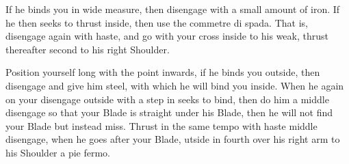 \newpage


\newpage


\exercise{}

If he binds you in wide measure, then disengage with a small amount of iron. If he then seeks to thrust inside, then use the commetre di spada. That is, disengage again with haste, and go with your cross inside to his weak, thrust thereafter second to his right Shoulder.

\exercise{}

Position yourself long with the point inwards, if he binds you
outside, then disengage and give him steel, with which he will bind
you inside. When he again on your disengage outside with a step in
seeks to bind, then do him a middle disengage so that your Blade is
straight under his Blade, then he will not find your Blade but instead
miss. Thrust in the same tempo with haste middle disengage, when he
goes after your Blade, utside in fourth over his right arm to his
Shoulder a pie fermo.



